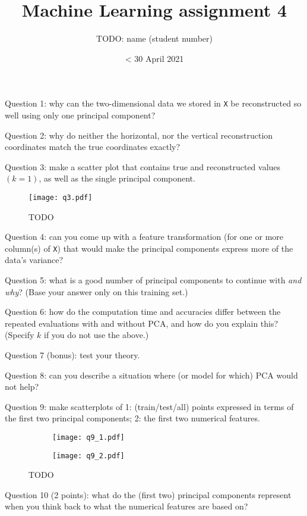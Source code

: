 \documentclass[12pt]{article}
\title{Machine Learning assignment 4}
\author{TODO: name (student number)}
\date{< 30 April 2021}
\newcommand{\question}[1]{{\large \textcolor{BrickRed}{Question #1}}}
\begin{document}
\maketitle



\question{1: why can the two-dimensional data we stored in \texttt{X} be reconstructed so well using only one principal component?}



\question{2: why do neither the horizontal, nor the vertical reconstruction coordinates match the true coordinates exactly?}



\question{3: make a scatter plot that contains true and reconstructed values $(k=1)$, as well as the single principal component.}

\begin{figure}[h]
    \centering
    \texttt{[image: q3.pdf]}
    \caption{TODO}
    \label{fig:q3}
\end{figure}

\question{4: can you come up with a feature transformation (for one or more column(s) of \texttt{X}) that would make the principal components express more of the data's variance?}



\question{5: what is a good number of principal components to continue with \textit{and why}? (Base your answer only on this training set.)}



\question{6: how do the computation time and accuracies differ between the repeated evaluations with and without PCA, and how do you explain this? (Specify $k$ if you do not use the above.)}



\question{7 (bonus): test your theory.}



\question{8: can you describe a situation where (or model for which) PCA would not help?}



\question{9: make scatterplots of 1: (train/test/all) points expressed in terms of the first two principal components; 2: the first two numerical features.}

\begin{figure}[h]
    \centering
    \begin{subfigure}{.49\textwidth}
        \texttt{[image: q9\_1.pdf]}
    \end{subfigure}
    \begin{subfigure}{.49\textwidth}
        \texttt{[image: q9\_2.pdf]}
    \end{subfigure}
    \caption{TODO}
    \label{fig:q9}
\end{figure}

\question{10 (2 points): what do the (first two) principal components represent when you think back to what the numerical features are based on?}
\end{document}
